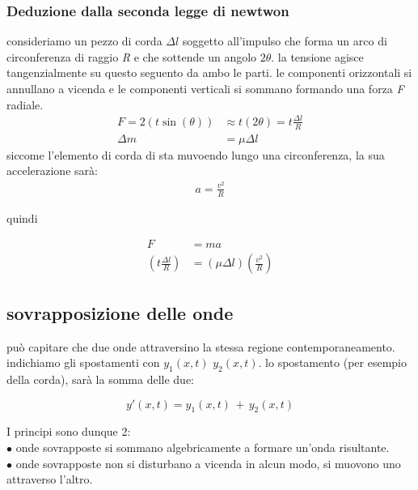 \documentclass[a4paper,11pt]{article}
\begin{document}
\subsubsection{Deduzione dalla seconda legge di newtwon}
consideriamo un pezzo di corda \( \Delta  l\) soggetto all'impulso che forma un arco di circonferenza di raggio \textit{R} e che sottende un angolo \(2 \theta\). la tensione agisce tangenzialmente su questo seguento da ambo le parti. le componenti orizzontali si annullano a vicenda e le componenti verticali si sommano formando una forza \textit{F} radiale. 
\begin{align*}
    F = 2 (\mathit{t} \sin(\theta) ) & \approx \mathit{t}  (2\theta) = \mathit{t} \frac{\Delta l}{R}  
    \\
    \Delta m &= \mu \Delta l
\end{align*}
siccome l'elemento di corda di sta muvoendo lungo una circonferenza, la sua accelerazione sarà:
\begin{align*}
a = \frac{v^2}{R}    
\end{align*}

quindi 

\begin{align*}
    F &= ma
    \\
    \left( \mathit{t} \frac{\Delta l}{R}\right) &= \left(\mu \Delta l\right) \left(\frac{v^2}{R}\right)
\end{align*}



\subsection{sovrapposizione delle onde}

può capitare che due onde attraversino la stessa regione contemporaneamento. indichiamo gli spostamenti con \( y_1(x,t) \, \, y_2(x,t) \). lo spostamento (per esempio della corda), sarà la somma delle due:
\begin{center}
    \[
      y \prime (x,t) = y_1(x,t) \, + \, y_2(x,t)    
    \]
\end{center}

I principi sono dunque 2:
\\
\( \bullet \) onde sovrapposte si sommano algebricamente a formare un'onda risultante. \\
\( \bullet \) onde sovrapposte non si disturbano a vicenda in alcun modo, si muovono uno attraverso l'altro.
\end{document}
